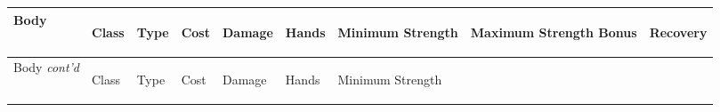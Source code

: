\documentclass[twoside]{book}
\begin{document}
\begin{longtable}{p{1.25in}llllp{2em}p{3em}p{3em}l} 
  Body
  &
  \begin{turn}{70}{Class}\end{turn}
          
  &
  \begin{turn}{70}{Type}\end{turn}
          
  &
  \begin{turn}{70}{Cost}\end{turn}
          
  &
  \begin{turn}{70}{Damage}\end{turn}
          
  &
  \begin{turn}{70}{Hands}\end{turn}
          
  &
  \begin{turn}{70}{Minimum Strength}\end{turn}
          
  &
  \begin{turn}{70}{Maximum Strength Bonus}\end{turn}
          
  &
  \begin{turn}{70}{Recovery}\end{turn}
          
  \\
  \hline
  \hline
  \endfirsthead
  Body \textit{cont'd}
        
  &
  \begin{turn}{70}{Class}\end{turn}
          
  &
  \begin{turn}{70}{Type}\end{turn}
          
  &
  \begin{turn}{70}{Cost}\end{turn}
          
  &
  \begin{turn}{70}{Damage}\end{turn}
          
  &
  \begin{turn}{70}{Hands}\end{turn}
          
  &
  \begin{turn}{70}{Minimum Strength}\end{turn}
          

\end{longtable}
\end{document}
